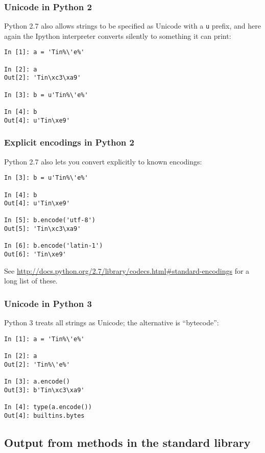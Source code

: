\documentclass{beamer}
\begin{document}
\begin{frame}[fragile]
  \frametitle{Unicode in Python 2}
  Python 2.7 also allows strings to be specified as Unicode with a \texttt{u} prefix, and here again the Ipython interpreter converts silently to something it can print:
  \vskip12pt  \begin{lstlisting}[escapechar=\%]
In [1]: a = 'Tin%\'e%'

In [2]: a
Out[2]: 'Tin\xc3\xa9'

In [3]: b = u'Tin%\'e%'

In [4]: b
Out[4]: u'Tin\xe9'
\end{lstlisting}

\end{frame}

\begin{frame}[fragile]
  \frametitle{Explicit encodings in Python 2}
  Python 2.7 also lets you convert explicitly to known encodings:
   \begin{lstlisting}[escapechar=\%]
In [3]: b = u'Tin%\'e%'

In [4]: b
Out[4]: u'Tin\xe9'

In [5]: b.encode('utf-8')
Out[5]: 'Tin\xc3\xa9'

In [6]: b.encode('latin-1')
Out[6]: 'Tin\xe9'
\end{lstlisting}

See \url{http://docs.python.org/2.7/library/codecs.html#standard-encodings} for a long list of these.

\end{frame}



\begin{frame}[fragile]
  \frametitle{Unicode in Python 3}
  Python 3 treats all strings as Unicode; the alternative is ``bytecode'':
   \begin{lstlisting}[escapechar=\%]
In [1]: a = 'Tin%\'e%'

In [2]: a
Out[2]: 'Tin%\'e%'

In [3]: a.encode()
Out[3]: b'Tin\xc3\xa9'

In [4]: type(a.encode())
Out[4]: builtins.bytes
\end{lstlisting}


\end{frame}

\subsection{Output from methods in the standard library}
\end{document}
